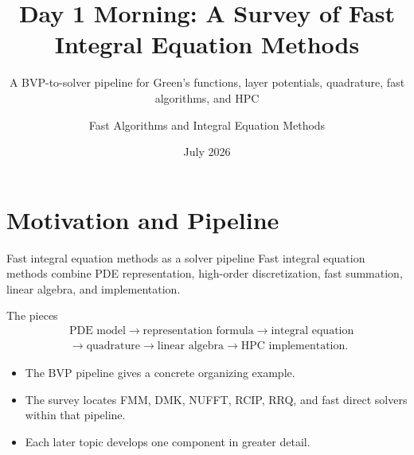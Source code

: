\documentclass[aspectratio=169,11pt]{beamer}
\title{Day 1 Morning: A Survey of Fast Integral Equation Methods}
\subtitle{A BVP-to-solver pipeline for Green's functions, layer potentials, quadrature, fast algorithms, and HPC}
\author{Fast Algorithms and Integral Equation Methods}
\institute{AMSS Summer Course}
\date{July 2026}
\begin{document}
\begin{frame}
  \titlepage
\end{frame}

\section{Motivation and Pipeline}

\begin{frame}{Fast integral equation methods as a solver pipeline}
\small
Fast integral equation methods combine PDE representation, high-order
discretization, fast summation, linear algebra, and implementation.

\begin{block}{The pieces}
\[
\begin{aligned}
&\text{PDE model}
\rightarrow
\text{representation formula}
\rightarrow
\text{integral equation}\\
&\rightarrow
\text{quadrature}
\rightarrow
\text{linear algebra}
\rightarrow
\text{HPC implementation}.
\end{aligned}
\]
\end{block}

\footnotesize
\begin{itemize}\setlength{\itemsep}{0pt}
  \item The BVP pipeline gives a concrete organizing example.
  \item The survey locates FMM, DMK, NUFFT, RCIP, RRQ, and fast direct solvers
  within that pipeline.
  \item Each later topic develops one component in greater detail.
\end{itemize}
\end{frame}
\end{document}
